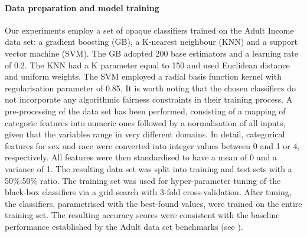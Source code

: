 \documentclass[letterpaper]{article} %
\begin{document}

\paragraph{Data preparation and model training}

Our experiments employ a set of opaque classifiers trained on the Adult Income data set: a gradient boosting (GB), a K-nearest neighbour (KNN) and a support vector machine (SVM). 
%
The GB adopted 200 base estimators and a learning rate of 0.2.
%
The KNN had a K parameter equal to 150 and used Euclidean distance and uniform weights.
%
The SVM employed a radial basis function kernel with regularisation parameter of 0.85.
%
It is worth noting that the chosen classifiers do not incorporate any algorithmic fairness constraints in their training process.
%
A pre-processing of the data set has been performed, consisting of a mapping of categoric features into numeric ones followed by a normalisation of all inputs, given that the variables range in very different domains.
%
In detail, categorical features for sex and race were converted into integer values between 0 and 1 or 4, respectively. All features were then standardised to have a mean of 0 and a variance of 1.
%
The resulting data set was split into training and test sets with a 50\%:50\% ratio.
%
The training set was used for hyper-parameter tuning of the black-box classifiers via a grid search with 3-fold cross-validation.
%
After tuning, the classifiers, parametrised with the best-found values, were trained on the entire training set.
%
The resulting accuracy scores were consistent with the baseline performance established by the Adult data set benchmarks (see ).
\end{document}
